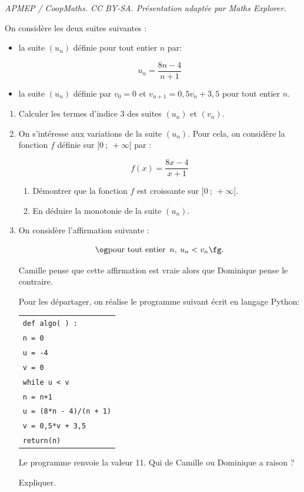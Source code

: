 \documentclass[10pt]{article}
\begin{document}
\noindent\textit{APMEP / CoopMaths. CC BY-SA. Présentation adaptée par Maths Explorer.}\par\medskip
\medskip

On considère les deux suites suivantes :

\setlength\parindent{9mm}
\begin{itemize}
\item[$\bullet~~$]la suite $\left(u_n\right)$ définie pour tout entier $n$ par:

\[u_n =  \dfrac{8n-4}{n+1}\]

\item[$\bullet~~$]la suite $\left(u_n\right)$ définie par $v_0 = 0$ et $v_{n+1} = 0,5v_n +3,5$ pour tout entier $n$.
\end{itemize}
\setlength\parindent{0mm}

\medskip

\begin{enumerate}
\item Calculer les termes d'indice 3 des suites $\left(u_n\right)$ et $\left(v_n\right)$.
\item On s'intéresse aux variations de la suite $\left(u_n\right)$.
 Pour cela, on considère la fonction $f$ définie sur $[0~;~+ \infty[$ par :
 
 \[f(x) = \dfrac{8x- 4}{x + 1}\]
 
	\begin{enumerate}
		\item Démontrer que la fonction $f$ est croissante sur $[0~;~+ \infty[$.
		\item En déduire la monotonie de la suite $\left(u_n\right)$.
	\end{enumerate} 
\item On considère l'affirmation suivante :

\[\og \text{pour tout entier }\, n,\: u_n < v_n \fg.\]

Camille pense que cette affirmation est vraie alors que Dominique pense le contraire.

Pour les départager, on réalise le programme suivant écrit en langage Python:

\begin{center}
\begin{tabularx}{0.5\linewidth}{|X|}\hline
\quad \texttt{def algo( )  :}\\
\quad \texttt{n = 0}\\
\quad \texttt{u = -4}\\
\quad \texttt{v = 0}\\
\quad \texttt{while u < v}\\
\qquad \texttt{n = n+1}\\
\qquad \texttt{u = (8*n - 4)/(n + 1)}\\ 
\qquad \texttt{v = 0,5*v + 3,5}\\
\quad \texttt{return(n)}\\ \hline
\end{tabularx}
\end{center}

Le programme renvoie la valeur 11. Qui de Camille ou Dominique a raison ? 

Expliquer.
\end{enumerate}

\bigskip
\end{document}
